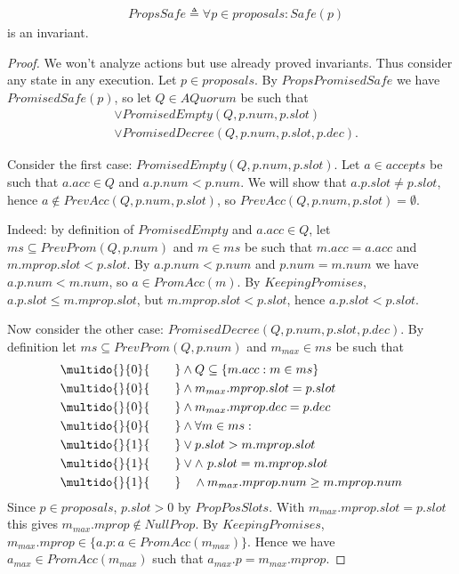 \documentclass[12pt,a4paper,en]{pracamgr}
\newcommand{\ind}[1]{\multido{}{#1}{\qquad}}
\begin{document}
\begin{lemma}
    \begin{align*}
        & PropsSafe \triangleq \forall p \in proposals: Safe(p)
    \end{align*}
    is an invariant.
\end{lemma}
\begin{proof}
    We won't analyze actions but use already proved invariants. Thus consider any state in any execution. Let $p \in proposals$. By $PropsPromisedSafe$ we have $PromisedSafe(p)$, so let $Q \in AQuorum$ be such that
    \begin{align*}
        & \lor PromisedEmpty(Q, p.num, p.slot)\\
        & \lor PromisedDecree(Q, p.num, p.slot, p.dec).
    \end{align*}

    Consider the first case: $PromisedEmpty(Q, p.num, p.slot)$. Let $a \in accepts$ be such that $a.acc \in Q$ and $a.p.num < p.num$. We will show that $a.p.slot \neq p.slot$, hence $a \notin PrevAcc(Q, p.num, p.slot)$, so $PrevAcc(Q, p.num, p.slot) = \emptyset$.

    Indeed: by definition of $PromisedEmpty$ and $a.acc \in Q$, let $ms \subseteq PrevProm(Q, p.num)$ and $m \in ms$ be such that $m.acc = a.acc$ and $m.mprop.slot < p.slot$. By $a.p.num < p.num$ and $p.num = m.num$ we have $a.p.num < m.num$, so $a \in PromAcc(m)$. By $KeepingPromises$, $a.p.slot \le m.mprop.slot$, but $m.mprop.slot < p.slot$, hence $a.p.slot < p.slot$.

    Now consider the other case: $PromisedDecree(Q, p.num, p.slot, p.dec)$. By definition let $ms \subseteq PrevProm(Q, p.num)$ and $m_{max} \in ms$ be such that
    \begin{align*}
        & \ind{0} \land Q \subseteq \{m.acc: m \in ms\}\\
        & \ind{0} \land m_{max}.mprop.slot = p.slot\\
        & \ind{0} \land m_{max}.mprop.dec = p.dec\\
        & \ind{0} \land \forall m \in ms:\\
        & \ind{1} \lor p.slot > m.mprop.slot\\
        & \ind{1} \lor \land\ p.slot = m.mprop.slot\\
        & \ind{1} \quad \land m_{max}.mprop.num \ge m.mprop.num
    \end{align*}
    Since $p \in proposals$, $p.slot > 0$ by $PropPosSlots$. With $m_{max}.mprop.slot = p.slot$ this gives $m_{max}.mprop \notin NullProp$. By $KeepingPromises$, $m_{max}.mprop \in \{a.p: a \in PromAcc(m_{max})\}$. Hence we have $a_{max} \in PromAcc(m_{max})$ such that $a_{max}.p = m_{max}.mprop$.


\end{proof}
\end{document}
